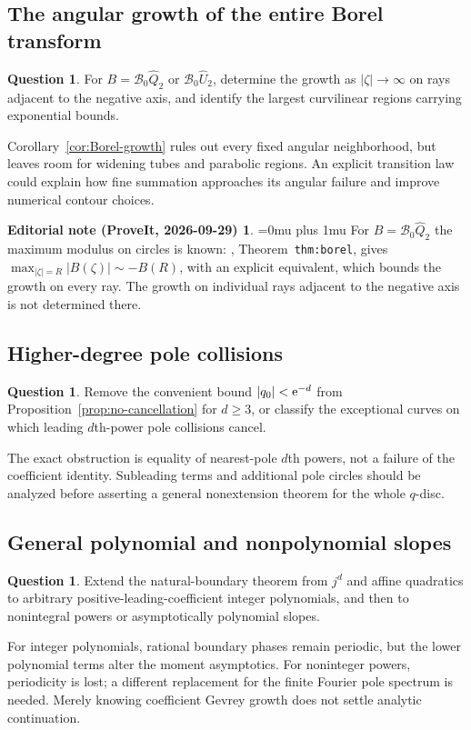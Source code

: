 \documentclass[11pt,a4paper]{article}
\numberwithin{equation}{section}
\theoremstyle{definition}\newtheorem{definition}[theorem]{Definition}
\newtheorem{question}[theorem]{Question}
\theoremstyle{remark}\newtheorem{remark}[theorem]{Remark}
\theoremstyle{definition}
\newtheorem*{ednoteinner}{Editorial note (ProveIt, 2026-09-29)}
\newenvironment{ednote}{\begin{ednoteinner}\sloppy\Urlmuskip=0mu plus 1mu\relax}{\end{ednoteinner}}
\newcommand{\Uhat}{\widehat U}\newcommand{\Qhat}{\widehat Q}
\newcommand{\B}{\mathcal B_0}\newcommand{\Hh}{\mathcal H}
\begin{document}
\subsection{The angular growth of the entire Borel transform}
\begin{question}
For $B=\B\Qhat_2$ or $\B\Uhat_2$, determine the growth as
$|\zeta|\to\infty$ on rays adjacent to the negative axis, and identify the
largest curvilinear regions carrying exponential bounds.
\end{question}
Corollary~\ref{cor:Borel-growth} rules out every fixed angular neighborhood,
but leaves room for widening tubes and parabolic regions. An explicit
transition law could explain how fine summation approaches its angular
failure and improve numerical contour choices.
\begin{ednote}
For $B=\B\Qhat_2$ the maximum modulus on circles is known:
 \cite{ed:sqi},
Theorem~\texttt{thm:borel}, gives $\max_{|\zeta|=R}|B(\zeta)|\sim-B(R)$, with
an explicit equivalent, which bounds the growth on every ray. The growth on
individual rays adjacent to the negative axis is not determined there.
\end{ednote}

\subsection{Higher-degree pole collisions}
\begin{question}
Remove the convenient bound $|q_0|<\mathrm e^{-d}$ from
Proposition~\ref{prop:no-cancellation} for $d\ge3$, or classify the exceptional
curves on which leading $d$th-power pole collisions cancel.
\end{question}
The exact obstruction is equality of nearest-pole $d$th powers, not a
failure of the coefficient identity. Subleading terms and additional pole
circles should be analyzed before asserting a general nonextension theorem
for the whole $q$-disc.

\subsection{General polynomial and nonpolynomial slopes}
\begin{question}
Extend the natural-boundary theorem from $j^d$ and affine quadratics to
arbitrary positive-leading-coefficient integer polynomials, and then to
nonintegral powers or asymptotically polynomial slopes.
\end{question}
For integer polynomials, rational boundary phases remain periodic, but the
lower polynomial terms alter the moment asymptotics. For noninteger powers,
periodicity is lost; a different replacement for the finite Fourier pole
spectrum is needed. Merely knowing coefficient Gevrey growth does not settle
analytic continuation.
\end{document}

